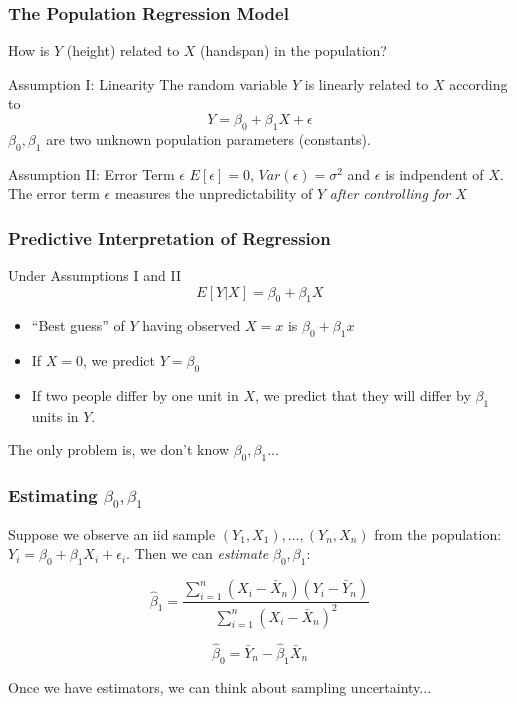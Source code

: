 \begin{frame}
	\frametitle{The Population Regression Model}
	How is $Y$ (height) related to $X$ (handspan) in the population?
	\begin{block}{Assumption I: Linearity}
		The random variable $Y$ is linearly related to $X$ according to 
			$$Y = \beta_0 + \beta_1 X + \epsilon$$
		$\beta_0,\beta_1$ are two unknown population parameters (constants).
	\end{block}

	\begin{block}
		{Assumption II: Error Term $\epsilon$}
		$E[\epsilon]=0$, $Var(\epsilon) = \sigma^2$ and $\epsilon$ is indpendent of $X$. The error term $\epsilon$ measures the unpredictability of $Y$ \emph{after controlling for $X$}
	\end{block}
\end{frame}
\begin{frame}
	\frametitle{Predictive Interpretation of Regression}
	\begin{block}
		{Under Assumptions I and II}
		$$E[Y|X] = \beta_0 + \beta_1 X$$ 
			\begin{itemize}
				\item ``Best guess'' of $Y$ having observed $X=x$ is $\beta_0 + \beta_1 x$
				\item If $X = 0$, we predict $Y = \beta_0$
				\item If two people differ by one unit in $X$, we predict that they will differ by $\beta_1$ units in $Y$.
			\end{itemize}
	\end{block}
	\alert{The only problem is, we don't know $\beta_0, \beta_1$...}
\end{frame}
\begin{frame}
	\frametitle{Estimating $\beta_0, \beta_1$}
Suppose we observe an iid sample $(Y_1, X_1), \hdots, (Y_n, X_n)$ from the population: $Y_i = \beta_0 + \beta_1 X_i + \epsilon_i$. Then we can \emph{estimate} $\beta_0, \beta_1$:

	$$\widehat{\beta}_1 = \frac{\sum_{i=1}^n (X_i - \bar{X}_n) (Y_i - \bar{Y}_n)}{\sum_{i=1}^n (X_i - \bar{X}_n)^2}$$

	
	$$\widehat{\beta}_0 = \bar{Y}_n - \widehat{\beta}_1 \bar{X}_n$$

\vspace{2em}
	\alert{Once we have estimators, we can think about sampling uncertainty...}
\end{frame}


